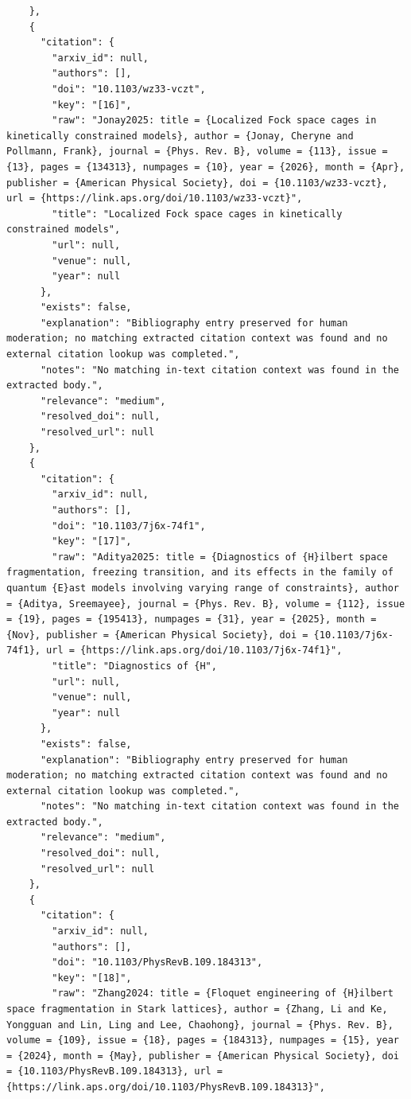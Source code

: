\documentclass[11pt]{article}
\begin{document}
\begin{verbatim}
    },
    {
      "citation": {
        "arxiv_id": null,
        "authors": [],
        "doi": "10.1103/wz33-vczt",
        "key": "[16]",
        "raw": "Jonay2025: title = {Localized Fock space cages in kinetically constrained models}, author = {Jonay, Cheryne and Pollmann, Frank}, journal = {Phys. Rev. B}, volume = {113}, issue = {13}, pages = {134313}, numpages = {10}, year = {2026}, month = {Apr}, publisher = {American Physical Society}, doi = {10.1103/wz33-vczt}, url = {https://link.aps.org/doi/10.1103/wz33-vczt}",
        "title": "Localized Fock space cages in kinetically constrained models",
        "url": null,
        "venue": null,
        "year": null
      },
      "exists": false,
      "explanation": "Bibliography entry preserved for human moderation; no matching extracted citation context was found and no external citation lookup was completed.",
      "notes": "No matching in-text citation context was found in the extracted body.",
      "relevance": "medium",
      "resolved_doi": null,
      "resolved_url": null
    },
    {
      "citation": {
        "arxiv_id": null,
        "authors": [],
        "doi": "10.1103/7j6x-74f1",
        "key": "[17]",
        "raw": "Aditya2025: title = {Diagnostics of {H}ilbert space fragmentation, freezing transition, and its effects in the family of quantum {E}ast models involving varying range of constraints}, author = {Aditya, Sreemayee}, journal = {Phys. Rev. B}, volume = {112}, issue = {19}, pages = {195413}, numpages = {31}, year = {2025}, month = {Nov}, publisher = {American Physical Society}, doi = {10.1103/7j6x-74f1}, url = {https://link.aps.org/doi/10.1103/7j6x-74f1}",
        "title": "Diagnostics of {H",
        "url": null,
        "venue": null,
        "year": null
      },
      "exists": false,
      "explanation": "Bibliography entry preserved for human moderation; no matching extracted citation context was found and no external citation lookup was completed.",
      "notes": "No matching in-text citation context was found in the extracted body.",
      "relevance": "medium",
      "resolved_doi": null,
      "resolved_url": null
    },
    {
      "citation": {
        "arxiv_id": null,
        "authors": [],
        "doi": "10.1103/PhysRevB.109.184313",
        "key": "[18]",
        "raw": "Zhang2024: title = {Floquet engineering of {H}ilbert space fragmentation in Stark lattices}, author = {Zhang, Li and Ke, Yongguan and Lin, Ling and Lee, Chaohong}, journal = {Phys. Rev. B}, volume = {109}, issue = {18}, pages = {184313}, numpages = {15}, year = {2024}, month = {May}, publisher = {American Physical Society}, doi = {10.1103/PhysRevB.109.184313}, url = {https://link.aps.org/doi/10.1103/PhysRevB.109.184313}",

\end{verbatim}
\end{document}
